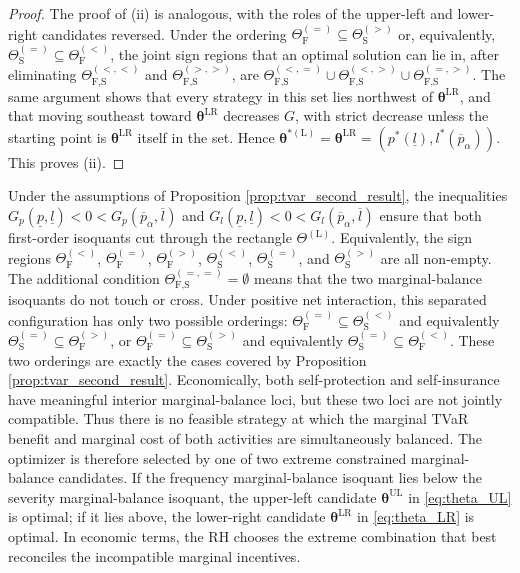\documentclass[a4paper,12pt]{article}
\begin{document}
\begin{proof}
The proof of (ii) is analogous, with the roles of the upper-left and lower-right candidates reversed. Under the ordering $\Theta_{\text{F}}^{\left(=\right)}\subseteq\Theta_{\text{S}}^{\left(>\right)}$ or, equivalently, $\Theta_{\text{S}}^{\left(=\right)}\subseteq\Theta_{\text{F}}^{\left(<\right)}$, the joint sign regions that an optimal solution can lie in, after eliminating $\Theta_{\text{F,S}}^{\left(<,<\right)}$ and $\Theta_{\text{F,S}}^{\left(>,>\right)}$, are $\Theta_{\text{F,S}}^{\left(<,=\right)}\cup\Theta_{\text{F,S}}^{\left(<,>\right)}\cup\Theta_{\text{F,S}}^{\left(=,>\right)}$. The same argument shows that every strategy in this set lies northwest of ${\bm\theta}^{\text{LR}}$, and that moving southeast toward ${\bm\theta}^{\text{LR}}$ decreases $G$, with strict decrease unless the starting point is ${\bm\theta}^{\text{LR}}$ itself in the set. Hence ${\bm\theta}^{*\left(\text{L}\right)}={\bm\theta}^{\text{LR}}=\left(p^*\left(\underline{l}\right),l^*\left(\overline{p}_{\alpha}\right)\right)$. This proves (ii).
\end{proof}

Under the assumptions of Proposition \ref{prop:tvar_second_result}, the inequalities $G_p\left(\underline{p},\underline{l}\right)<0<G_p\left(\overline{p}_{\alpha},\overline{l}\right)$ and $G_l\left(\underline{p},\underline{l}\right)<0<G_l\left(\overline{p}_{\alpha},\overline{l}\right)$ ensure that both first-order isoquants cut through the rectangle $\Theta^{\left(\text{L}\right)}$. Equivalently, the sign regions $\Theta_{\text{F}}^{\left(<\right)}$, $\Theta_{\text{F}}^{\left(=\right)}$, $\Theta_{\text{F}}^{\left(>\right)}$, $\Theta_{\text{S}}^{\left(<\right)}$, $\Theta_{\text{S}}^{\left(=\right)}$, and $\Theta_{\text{S}}^{\left(>\right)}$ are all non-empty. The additional condition $\Theta_{\text{F,S}}^{\left(=,=\right)}=\emptyset$ means that the two marginal-balance isoquants do not touch or cross. Under positive net interaction, this separated configuration has only two possible orderings: $\Theta_{\text{F}}^{\left(=\right)}\subseteq\Theta_{\text{S}}^{\left(<\right)}$ and equivalently $\Theta_{\text{S}}^{\left(=\right)}\subseteq\Theta_{\text{F}}^{\left(>\right)}$, or $\Theta_{\text{F}}^{\left(=\right)}\subseteq\Theta_{\text{S}}^{\left(>\right)}$ and equivalently $\Theta_{\text{S}}^{\left(=\right)}\subseteq\Theta_{\text{F}}^{\left(<\right)}$. These two orderings are exactly the cases covered by Proposition \ref{prop:tvar_second_result}. Economically, both self-protection and self-insurance have meaningful interior marginal-balance loci, but these two loci are not jointly compatible. Thus there is no feasible strategy at which the marginal TVaR benefit and marginal cost of both activities are simultaneously balanced. The optimizer is therefore selected by one of two extreme constrained marginal-balance candidates. If the frequency marginal-balance isoquant lies below the severity marginal-balance isoquant, the upper-left candidate ${\bm\theta}^{\text{UL}}$ in \eqref{eq:theta_UL} is optimal; if it lies above, the lower-right candidate ${\bm\theta}^{\text{LR}}$ in \eqref{eq:theta_LR} is optimal. In economic terms, the RH chooses the extreme combination that best reconciles the incompatible marginal incentives.
\end{document}
